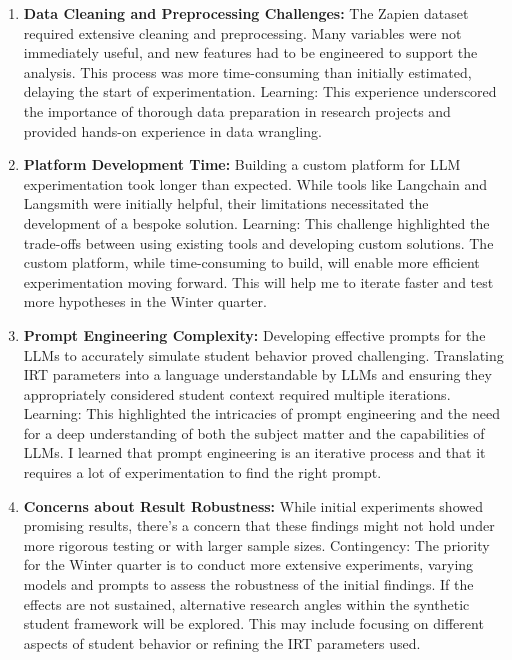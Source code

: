 \documentclass[12pt, letterpaper]{article}
\begin{document}
\begin{enumerate}
    \item \textbf{Data Cleaning and Preprocessing Challenges:} The Zapien dataset required extensive cleaning and preprocessing. Many variables were not immediately useful, and new features had to be engineered to support the analysis. This process was more time-consuming than initially estimated, delaying the start of experimentation.
    Learning: This experience underscored the importance of thorough data preparation in research projects and provided hands-on experience in data wrangling.
    
    \item \textbf{Platform Development Time:} Building a custom platform for LLM experimentation took longer than expected. While tools like Langchain and Langsmith were initially helpful, their limitations necessitated the development of a bespoke solution.
    Learning: This challenge highlighted the trade-offs between using existing tools and developing custom solutions. The custom platform, while time-consuming to build, will enable more efficient experimentation moving forward. This will help me to iterate faster and test more hypotheses in the Winter quarter.
    
    \item \textbf{Prompt Engineering Complexity:} Developing effective prompts for the LLMs to accurately simulate student behavior proved challenging. Translating IRT parameters into a language understandable by LLMs and ensuring they appropriately considered student context required multiple iterations.
    Learning: This highlighted the intricacies of prompt engineering and the need for a deep understanding of both the subject matter and the capabilities of LLMs. I learned that prompt engineering is an iterative process and that it requires a lot of experimentation to find the right prompt.
    
    \item \textbf{Concerns about Result Robustness:} While initial experiments showed promising results, there's a concern that these findings might not hold under more rigorous testing or with larger sample sizes.
    Contingency: The priority for the Winter quarter is to conduct more extensive experiments, varying models and prompts to assess the robustness of the initial findings. If the effects are not sustained, alternative research angles within the synthetic student framework will be explored. This may include focusing on different aspects of student behavior or refining the IRT parameters used.
\end{enumerate}
\end{document}
